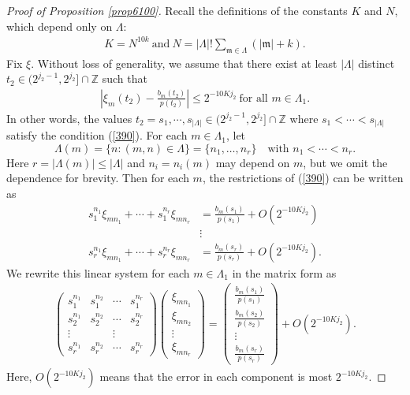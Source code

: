 \documentclass[10pt,a4paper]{amsart}
\numberwithin{equation}{section}
\begin{document}
\begin{proof}[Proof of Proposition \ref{prop6100}] 
Recall the definitions of the constants  $K$ and $N$, which depend only on $\Lambda$:
\begin{align*}
	K=N^{10k}\ \text{and}\ N=\lvert\Lambda\rvert!\sum_{\mathfrak{m}\in \Lambda} (|\mathfrak{m}|+k).
\end{align*} Fix $\xi$. Without loss of generality, we assume that 
there exist at least $|\Lambda|$ distinct  $t_2 \in (2^{j_2-1},2^{j_2}]\cap \mathbb{Z}$ such that
\begin{align} \label{390}
 \left|\xi_m(t_2)-\frac{b_m(t_2)}{p(t_2)}\right|\le 2^{-10Kj_2} \ \text{for all $m\in \Lambda_1$}.
\end{align}
In other words, the values $t_2=s_1,\cdots, s_{|\Lambda|} \in (2^{j_2-1},2^{j_2}]\cap \mathbb{Z}$ where 
   $s_1<\cdots<s_{|\Lambda|}$ satisfy the condition (\ref{390}).
 For each $m\in \Lambda_1$, let  $$\Lambda(m)=\{n: (m,n)\in \Lambda\}=
\{n_{1},\dots,n_{r}\} \quad \text{with } n_{1}<\cdots<n_{r}
.$$ Here $r=|\Lambda(m)|\le |\Lambda|$ and $n_i=n_i(m)$ may depend on $m$, but we omit the dependence  
  for brevity.  Then for each $m$, the  restrictions of (\ref{390}) can be written as 
\begin{align*}
s_1^{n_1}\xi_{mn_1}+\cdots+s_1^{n_{r}}\xi_{mn_{r}}&=\frac{b_m(s_1)}{p(s_1)}+O(2^{-10Kj_2})\\
&\vdots\\
s_{r}^{n_1}\xi_{mn_1}+\cdots+s_{r}^{n_{r}}\xi_{mn_{r}}&=\frac{b_m(s_{r})}{p(s_{r})}+O(2^{-10Kj_2}).
\end{align*}
We rewrite  this linear system  for each $m\in \Lambda_1$  in the matrix form as
\begin{align}\label{meg1}
\left(\begin{matrix}s_1^{n_{1}}&s_1^{n_{2}}& \cdots&s_1^{n_{r}}\\
s_2^{n_{1}}&s_2^{n_{2}}& \cdots&s_2^{n_{r}}\\
\vdots& &\vdots\\
s_{r}^{n_{1}}&s_{r}^{n_{2}}& \cdots&s_{r}^{n_{r}}
  \end{matrix}\right) \left(\begin{matrix}\xi_{mn_1}\\
\xi_{mn_2}\\
 \vdots\\
\xi_{mn_r}
  \end{matrix}\right)=\left(\begin{matrix}\frac{b_m(s_1)}{p(s_1)}\\
\frac{b_m(s_2)}{p(s_2)}\\
 \vdots\\
\frac{b_m(s_r)}{p(s_r)}
  \end{matrix}\right)+O(2^{-10Kj_2}).
\end{align}
Here,  $O(2^{-10Kj_2})$ means that the error in each component is  most $2^{-10Kj_2}$.




\end{proof}
\end{document}

